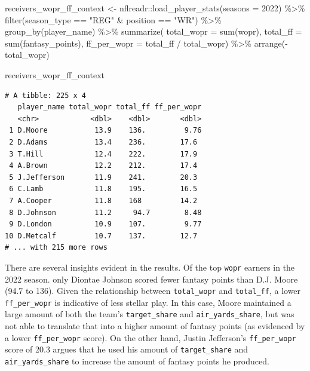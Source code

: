 \documentclass[
  letterpaper,
]{krantz}
\newenvironment{Shaded}{\begin{snugshade}}{\end{snugshade}}
\newcommand{\AttributeTok}[1]{\textcolor[rgb]{0.40,0.45,0.13}{#1}}
\newcommand{\DecValTok}[1]{\textcolor[rgb]{0.68,0.00,0.00}{#1}}
\newcommand{\FunctionTok}[1]{\textcolor[rgb]{0.28,0.35,0.67}{#1}}
\newcommand{\NormalTok}[1]{\textcolor[rgb]{0.00,0.23,0.31}{#1}}
\newcommand{\OtherTok}[1]{\textcolor[rgb]{0.00,0.23,0.31}{#1}}
\newcommand{\SpecialCharTok}[1]{\textcolor[rgb]{0.37,0.37,0.37}{#1}}
\newcommand{\StringTok}[1]{\textcolor[rgb]{0.13,0.47,0.30}{#1}}
\begin{document}
\begin{Shaded}
\begin{Highlighting}[]
\NormalTok{receivers\_wopr\_ff\_context }\OtherTok{\textless{}{-}}
\NormalTok{  nflreadr}\SpecialCharTok{::}\FunctionTok{load\_player\_stats}\NormalTok{(}\AttributeTok{seasons =} \DecValTok{2022}\NormalTok{) }\SpecialCharTok{\%\textgreater{}\%}
  \FunctionTok{filter}\NormalTok{(season\_type }\SpecialCharTok{==} \StringTok{"REG"} \SpecialCharTok{\&}\NormalTok{ position }\SpecialCharTok{==} \StringTok{"WR"}\NormalTok{) }\SpecialCharTok{\%\textgreater{}\%}
  \FunctionTok{group\_by}\NormalTok{(player\_name) }\SpecialCharTok{\%\textgreater{}\%}
  \FunctionTok{summarize}\NormalTok{(}
    \AttributeTok{total\_wopr =} \FunctionTok{sum}\NormalTok{(wopr),}
    \AttributeTok{total\_ff =} \FunctionTok{sum}\NormalTok{(fantasy\_points),}
    \AttributeTok{ff\_per\_wopr =}\NormalTok{ total\_ff }\SpecialCharTok{/}\NormalTok{ total\_wopr) }\SpecialCharTok{\%\textgreater{}\%}
  \FunctionTok{arrange}\NormalTok{(}\SpecialCharTok{{-}}\NormalTok{total\_wopr)}

\NormalTok{receivers\_wopr\_ff\_context}
\end{Highlighting}
\end{Shaded}

\begin{verbatim}
# A tibble: 225 x 4
   player_name total_wopr total_ff ff_per_wopr
   <chr>            <dbl>    <dbl>       <dbl>
 1 D.Moore           13.9    136.         9.76
 2 D.Adams           13.4    236.        17.6 
 3 T.Hill            12.4    222.        17.9 
 4 A.Brown           12.2    212.        17.4 
 5 J.Jefferson       11.9    241.        20.3 
 6 C.Lamb            11.8    195.        16.5 
 7 A.Cooper          11.8    168         14.2 
 8 D.Johnson         11.2     94.7        8.48
 9 D.London          10.9    107.         9.77
10 D.Metcalf         10.7    137.        12.7 
# ... with 215 more rows
\end{verbatim}

There are several insights evident in the results. Of the top
\texttt{wopr} earners in the 2022 season. only Diontae Johnson scored
fewer fantasy points than D.J. Moore (94.7 to 136). Given the
relationship between \texttt{total\_wopr} and \texttt{total\_ff}, a
lower \texttt{ff\_per\_wopr} is indicative of less stellar play. In this
case, Moore maintained a large amount of both the team's
\texttt{target\_share} and \texttt{air\_yards\_share}, but was not able
to translate that into a higher amount of fantasy points (as evidenced
by a lower \texttt{ff\_per\_wopr} score). On the other hand, Justin
Jefferson's \texttt{ff\_per\_wopr} score of 20.3 argues that he used his
amount of \texttt{target\_share} and \texttt{air\_yards\_share} to
increase the amount of fantasy points he produced.
\end{document}
